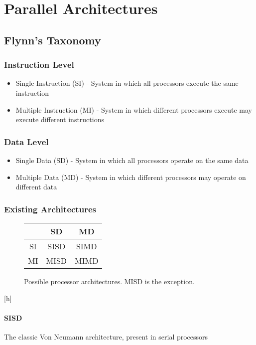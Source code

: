 \section{Parallel Architectures}

\subsection{Flynn's Taxonomy}

\subsubsection{Instruction Level}
\begin{itemize}
    \item Single Instruction (SI) - System in which all processors execute the same instruction
    \item Multiple Instruction (MI) - System in which different processors execute may execute different instructions
\end{itemize}

\subsubsection{Data Level}
\begin{itemize}
    \item Single Data (SD) - System in which all processors operate on the same data
    \item Multiple Data (MD) - System in which different processors may operate on different data
\end{itemize}

\subsubsection{Existing Architectures}

\begin{figure}[h]
    \centering
    \begin{tabular}{c | c | c}
           & SD   & MD   \\
        \hline
        SI & SISD & SIMD \\
        \hline
        MI & MISD & MIMD \\
    \end{tabular}
    \caption{Possible processor architectures. MISD is the exception.}
    \label{fig:flynn}
\end{figure}[h]

\paragraph{SISD}
The classic Von Neumann architecture, present in serial processors


